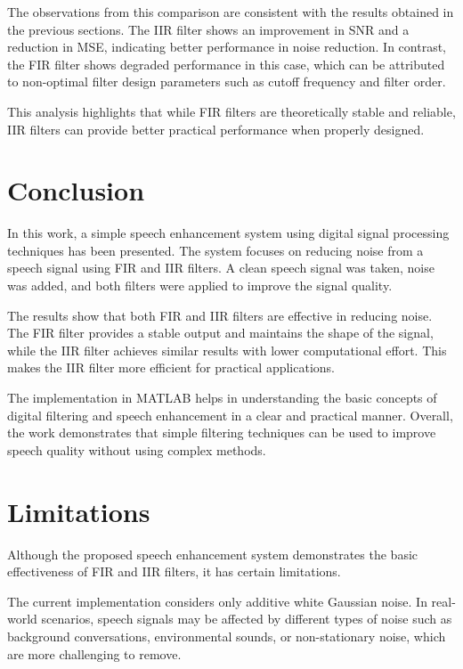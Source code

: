 \documentclass[conference]{IEEEtran}
\begin{document}
The observations from this comparison are consistent with the results obtained in the previous sections. The IIR filter shows an improvement in SNR and a reduction in MSE, indicating better performance in noise reduction. In contrast, the FIR filter shows degraded performance in this case, which can be attributed to non-optimal filter design parameters such as cutoff frequency and filter order.

This analysis highlights that while FIR filters are theoretically stable and reliable, IIR filters can provide better practical performance when properly designed.

\section{Conclusion}

In this work, a simple speech enhancement system using digital signal processing techniques has been presented. The system focuses on reducing noise from a speech signal using FIR and IIR filters. A clean speech signal was taken, noise was added, and both filters were applied to improve the signal quality.

The results show that both FIR and IIR filters are effective in reducing noise. The FIR filter provides a stable output and maintains the shape of the signal, while the IIR filter achieves similar results with lower computational effort. This makes the IIR filter more efficient for practical applications.

The implementation in MATLAB helps in understanding the basic concepts of digital filtering and speech enhancement in a clear and practical manner. Overall, the work demonstrates that simple filtering techniques can be used to improve speech quality without using complex methods.

\section{Limitations}

Although the proposed speech enhancement system demonstrates the basic effectiveness of FIR and IIR filters, it has certain limitations.

The current implementation considers only additive white Gaussian noise. In real-world scenarios, speech signals may be affected by different types of noise such as background conversations, environmental sounds, or non-stationary noise, which are more challenging to remove.
\end{document}
